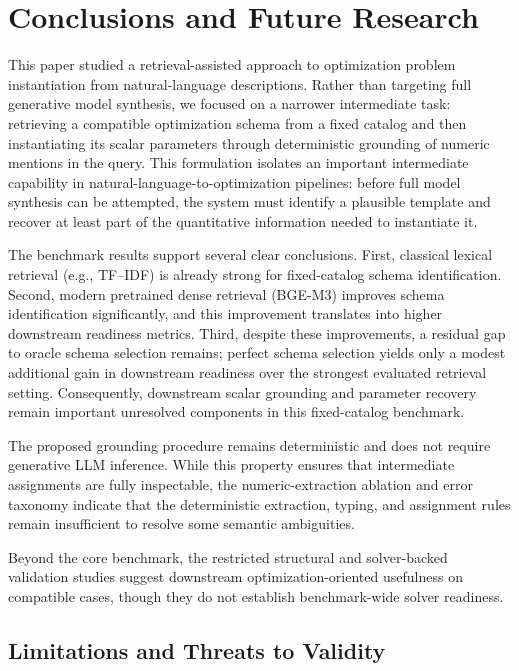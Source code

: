 \documentclass[pdflatex,sn-basic,Numbered]{sn-jnl}
\begin{document}
\section{Conclusions and Future Research}
\label{sec:conclusion}

This paper studied a retrieval-assisted approach to optimization problem instantiation from natural-language descriptions. Rather than targeting full generative model synthesis, we focused on a narrower intermediate task: retrieving a compatible optimization schema from a fixed catalog and then instantiating its scalar parameters through deterministic grounding of numeric mentions in the query. This formulation isolates an important intermediate capability in natural-language-to-optimization pipelines: before full model synthesis can be attempted, the system must identify a plausible template and recover at least part of the quantitative information needed to instantiate it.

The benchmark results support several clear conclusions. First, classical lexical retrieval (e.g., TF--IDF) is already strong for fixed-catalog schema identification. Second, modern pretrained dense retrieval (BGE-M3) improves schema identification significantly, and this improvement translates into higher downstream readiness metrics. Third, despite these improvements, a residual gap to oracle schema selection remains; perfect schema selection yields only a modest additional gain in downstream readiness over the strongest evaluated retrieval setting. Consequently, downstream scalar grounding and parameter recovery remain important unresolved components in this fixed-catalog benchmark.

The proposed grounding procedure remains deterministic and does not require generative LLM inference. While this property ensures that intermediate assignments are fully inspectable, the numeric-extraction ablation and error taxonomy indicate that the deterministic extraction, typing, and assignment rules remain insufficient to resolve some semantic ambiguities. 

Beyond the core benchmark, the restricted structural and solver-backed validation studies suggest downstream optimization-oriented usefulness on compatible cases, though they do not establish benchmark-wide solver readiness.

\subsection{Limitations and Threats to Validity}
\label{subsec:limitations}
\end{document}
